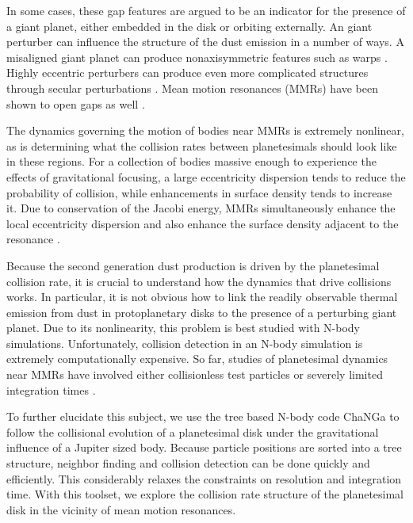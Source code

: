 \documentclass[twocolumn]{aastex63}
\begin{document}
In some cases, these gap features are argued to be an indicator for the presence of a giant planet, either embedded in the disk 
\citep{2015MNRAS.453L..73D} or orbiting externally. An giant perturber can influence the structure of the dust emission in a number 
of ways. A misaligned giant planet can produce nonaxisymmetric features such as warps \citep{2001A&A...370..447A}. Highly 
eccentric perturbers can produce even more complicated structures through secular perturbations \citep{2014MNRAS.443.2541P, 
2015MNRAS.448.3679P}. Mean motion resonances (MMRs) have been shown to open gaps as well
\citep{2015ApJ...798...83N, 2016ApJ...818..159T, 2018ApJ...857....3T}.

The dynamics governing the motion of bodies near MMRs is extremely nonlinear, as is determining what the collision rates between 
planetesimals should look like in these regions. For a collection of bodies massive enough to experience the effects of gravitational 
focusing, a large eccentricity dispersion tends to reduce the probability of collision, while enhancements in surface density tends to 
increase it. Due to conservation of the Jacobi energy, MMRs simultaneously enhance the local eccentricity dispersion and also 
enhance the surface density adjacent to the resonance \citep{2000Icar..143...45R, 2017ApJ...850..103B}.

Because the second generation dust production is driven by the planetesimal collision rate, it is crucial to understand how the 
dynamics that drive collisions works. In particular, it is not obvious how to link the readily observable thermal emission from dust in 
protoplanetary disks to the presence of a perturbing giant planet. Due to its nonlinearity, this problem is best studied with N-body 
simulations. Unfortunately, collision detection in an N-body simulation is extremely computationally expensive. So far, studies of 
planetesimal dynamics near MMRs have involved either collisionless test particles \citep{2017ApJ...850..103B, 2016ApJ...818..159T, 
2018ApJ...857....3T} or severely limited integration times \citep{2000Icar..143...45R}.

To further elucidate this subject, we use the tree based N-body code {\sc ChaNGa}
\citep{2008IEEEpds...ChaNGa, 2015AphCom..2..1} to follow the collisional evolution of a planetesimal disk under the gravitational 
influence of a Jupiter sized body. Because particle positions are sorted into a tree structure, neighbor finding and collision detection 
can be done quickly and efficiently. This considerably relaxes the constraints on resolution and integration time. With this toolset, we 
explore the collision rate structure of the planetesimal disk in the vicinity of mean motion resonances.
\end{document}
